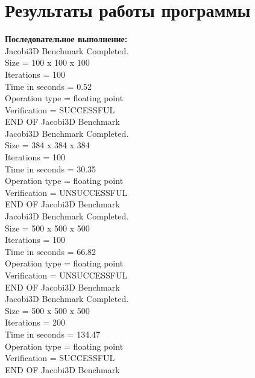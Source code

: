 \documentclass[a4paper,12pt,titlepage,draft]{article}
\begin{document}
\section{Результаты работы программы}
\begin{minipage}{.5\textwidth}
\textbf{Последовательное выполнение:}\\

 Jacobi3D Benchmark Completed.\\
 Size            =  100 x  100 x  100\\
 Iterations      =                100\\
 Time in seconds =               0.52\\
 Operation type  =     floating point\\
 Verification    =         SUCCESSFUL\\
 END OF Jacobi3D Benchmark\\
 
Jacobi3D Benchmark Completed.\\
Size            =  384 x  384 x  384\\
Iterations      =                100\\
Time in seconds =              30.35\\
Operation type  =     floating point\\
Verification    =       UNSUCCESSFUL\\
END OF Jacobi3D Benchmark\\

Jacobi3D Benchmark Completed.\\
 Size            =  500 x  500 x  500\\
 Iterations      =                100\\
 Time in seconds =              66.82\\
 Operation type  =     floating point\\
 Verification    =       UNSUCCESSFUL\\
 END OF Jacobi3D Benchmark\\

Jacobi3D Benchmark Completed.\\
 Size            =  500 x  500 x  500\\
 Iterations      =                200\\
 Time in seconds =             134.47\\
 Operation type  =     floating point\\
 Verification    =         SUCCESSFUL\\
 END OF Jacobi3D Benchmark\\
 
\end{minipage}
\end{document}
